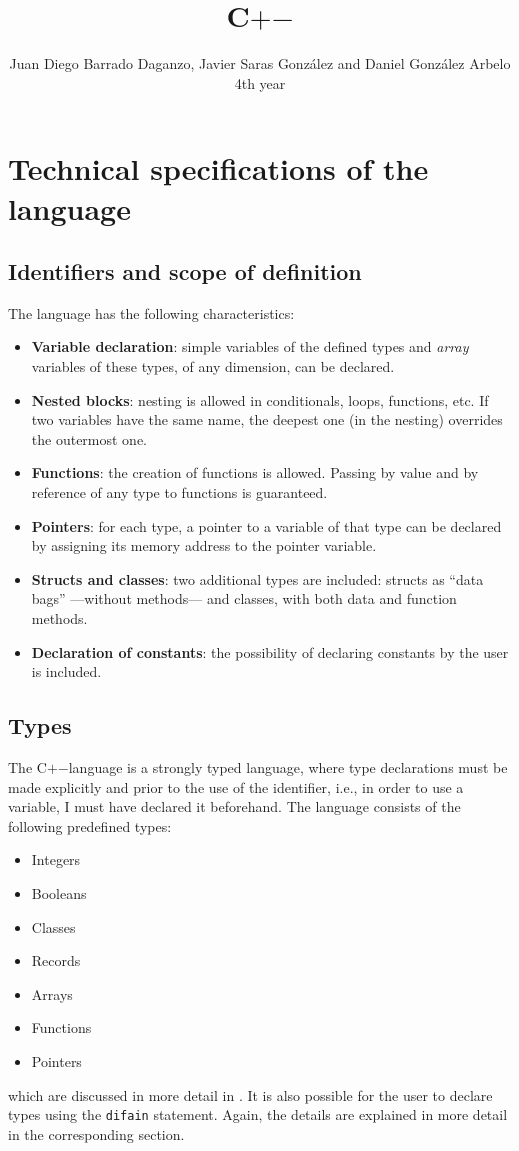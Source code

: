 \documentclass[10pt,a4paper]{article}
\title{\Huge C$+$$-$}
\author{Juan Diego Barrado Daganzo, Javier Saras González and Daniel González Arbelo \\ 4th year}
\date{}
\newcommand{\cpm}{C$+$$-$}
\begin{document}
\maketitle
\tableofcontents

\section{Technical specifications of the language}\label{sec:Especificaciones técnicas del lenguaje}
\subsection{Identifiers and scope of definition}\label{subsec:Identificadores y ámbitos de definición}
The language has the following characteristics:
\begin{itemize}
\item \textbf{Variable declaration}: simple variables of the defined types and \textit{array} variables of these types, of any dimension, can be declared.
\item \textbf{Nested blocks}: nesting is allowed in conditionals, loops, functions, etc. If two variables have the same name, the deepest one (in the nesting) overrides the outermost one.
\item \textbf{Functions}: the creation of functions is allowed. Passing by value and by reference of any type to functions is guaranteed.
\item \textbf{Pointers}: for each type, a pointer to a variable of that type can be declared by assigning its memory address to the pointer variable.
\item \textbf{Structs and classes}: two additional types are included: structs as “data bags” ---without methods--- and classes, with both data and function methods.
\item \textbf{Declaration of constants}: the possibility of declaring constants by the user is included.
\end{itemize}

\subsection{Types}\label{subsec:Tipos}
The \cpm language is a strongly typed language, where type declarations must be made explicitly and prior to the use of the identifier, i.e., in order to use a variable, I must have declared it beforehand.
The language consists of the following predefined types:
\begin{itemize}
    \item Integers
    \item Booleans
    \item Classes
    \item Records
    \item Arrays
    \item Functions
    \item Pointers
\end{itemize}
which are discussed in more detail in . It is also possible for the user to declare types using the \texttt{\color{blue}difain} statement. Again, the details are explained in more detail in the corresponding section.
\end{document}
